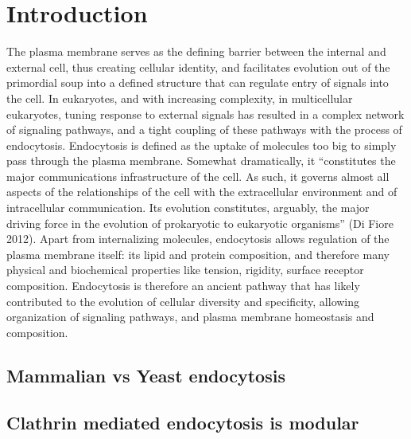 \chapter{Introduction} %

\label{Ch:Aims} %



The plasma membrane serves as the defining barrier between the internal and external cell, thus creating cellular identity, and facilitates evolution out of the primordial soup into a defined structure that can regulate entry of signals into the cell. In eukaryotes, and with increasing complexity, in multicellular eukaryotes, tuning response to external signals has resulted in a complex network of signaling pathways, and a tight coupling of these pathways with the process of endocytosis. Endocytosis is defined as the uptake of molecules too big to simply pass through the plasma membrane. Somewhat dramatically, it “constitutes the major communications infrastructure of the cell. As such, it governs almost all aspects of the relationships of the cell with the extracellular environment and of intracellular communication. Its evolution constitutes, arguably, the major driving force in the evolution of prokaryotic to eukaryotic organisms” (Di Fiore 2012).  Apart from internalizing molecules, endocytosis allows regulation of the plasma membrane itself: its lipid and protein composition, and therefore many physical and biochemical properties like tension, rigidity, surface receptor composition. Endocytosis is therefore an ancient pathway that has likely contributed to the evolution of cellular diversity and specificity, allowing organization of signaling pathways, and plasma membrane homeostasis and composition. 



	
	\section{Mammalian vs Yeast endocytosis}
	
	
	\section{Clathrin mediated endocytosis is modular}
